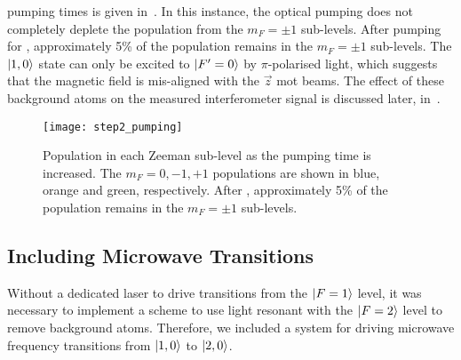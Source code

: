 pumping times is given in~. In this
instance, the optical pumping does not completely deplete the
population from the \(m_F = \pm 1\) sub-levels. After pumping for
, approximately 5\% of the population
remains in the \(m_F = \pm 1\) sub-levels. The \(\ket{1,0}\) state can
only be excited to \(\ket{F'=0}\) by \(\pi\)-polarised light, which
suggests that the magnetic field is mis-aligned with the \(\vec{z}\)
\ac{mot} beams. The effect of these background atoms on the measured
interferometer signal is discussed later,
in~.
\begin{figure}[!htbp]
    \centering
    \texttt{[image: step2\_pumping]}
    \caption[\(\ket{1,m_F}\) populations for increasing  pumping time.]{Population in each Zeeman sub-level as the  pumping time is increased. The \(m_F = 0, -1, +1\) populations are shown in blue, orange and green, respectively. After , approximately 5\% of the population remains in the \(m_F = \pm 1\) sub-levels.}
    \label{fig:step2_pumping}
\end{figure}
\subsection{Including Microwave Transitions}\label{subsec:microwaves}
Without a dedicated laser to drive transitions from the \(\ket{F=1}\)
level, it was necessary to implement a scheme to use light resonant
with the \(\ket{F=2}\) level to remove background atoms. Therefore, we
included a system for driving microwave frequency transitions from
\(\ket{1,0}\) to \(\ket{2,0}\).
